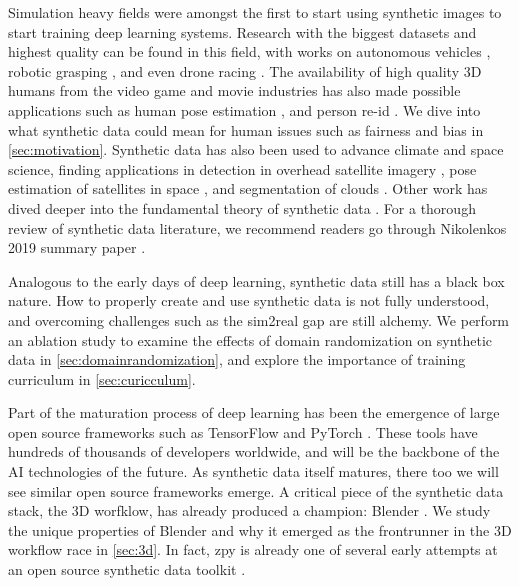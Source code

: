 \documentclass{article}
\begin{document}
Simulation heavy fields were amongst the first to start using synthetic images to start training deep learning systems. Research with the biggest datasets and highest quality can be found in this field, with works on autonomous vehicles \cite{prakash2020structured} \cite{srivastava2019multi} \cite{Hahner_2019} \cite{7780721}, robotic grasping \cite{james2019simtoreal} \cite{tobin2017domain}, and even drone racing \cite{Loquercio_2020}. The availability of high quality 3D humans from the video game and movie industries has also made possible applications such as human pose estimation  \cite{shrivastava2017learning} \cite{Varol_2017}, and person re-id \cite{aaronASRC}. We dive into what synthetic data could mean for human issues such as fairness and bias in \ref{sec:motivation}. Synthetic data has also been used to advance climate and space science, finding applications in detection in overhead satellite imagery \cite{shermeyer2020rareplanes}, pose estimation of satellites in space \cite{kisantal2020satellite}, and segmentation of clouds \cite{lyu2020learning}. Other work has dived deeper into the fundamental theory of synthetic data \cite{le2017using}. For a thorough review of synthetic data literature, we recommend readers go through Nikolenkos 2019 summary paper \cite{nikolenko2019synthetic}.

Analogous to the early days of deep learning, synthetic data still has a black box nature. How to properly create and use synthetic data is not fully understood, and overcoming challenges such as the sim2real gap are still alchemy. We perform an ablation study to examine the effects of domain randomization on synthetic data in \ref{sec:domainrandomization}, and explore the importance of training curriculum in \ref{sec:curicculum}.

Part of the maturation process of deep learning has been the emergence of large open source frameworks such as TensorFlow \cite{tensorflow} and PyTorch \cite{pytorch}. These tools have hundreds of thousands of developers worldwide, and will be the backbone of the AI technologies of the future. As synthetic data itself matures, there too we will see similar open source frameworks emerge. A critical piece of the synthetic data stack, the 3D worfklow, has already produced a champion: Blender \cite{blender}. We study the unique properties of Blender and why it emerged as the frontrunner in the 3D workflow race in \ref{sec:3d}. In fact, zpy is already one of several early attempts at an open source synthetic data toolkit \cite{denninger2019blenderproc} \cite{bpycv}.
\end{document}

